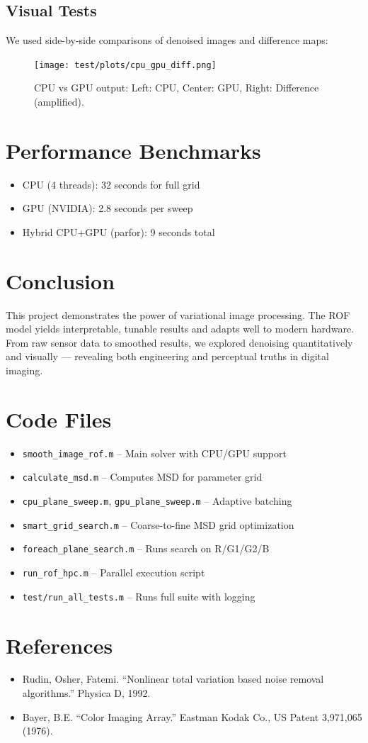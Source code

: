 \documentclass[11pt]{article}
\begin{document}
\subsection*{Visual Tests}
We used side-by-side comparisons of denoised images and difference maps:

\begin{figure}[h]
    \centering
    \texttt{[image: test/plots/cpu\_gpu\_diff.png]}
    \caption{CPU vs GPU output: Left: CPU, Center: GPU, Right: Difference (amplified).}
\end{figure}

\section*{Performance Benchmarks}
\begin{itemize}
  \item CPU (4 threads): 32 seconds for full grid
  \item GPU (NVIDIA): 2.8 seconds per sweep
  \item Hybrid CPU+GPU (parfor): 9 seconds total
\end{itemize}

\section*{Conclusion}
This project demonstrates the power of variational image processing. The ROF model yields interpretable, tunable results and adapts well to modern hardware. From raw sensor data to smoothed results, we explored denoising quantitatively and visually — revealing both engineering and perceptual truths in digital imaging.

\appendix
\section*{Code Files}
\begin{itemize}
  \item \texttt{smooth\_image\_rof.m} – Main solver with CPU/GPU support
  \item \texttt{calculate\_msd.m} – Computes MSD for parameter grid
  \item \texttt{cpu\_plane\_sweep.m}, \texttt{gpu\_plane\_sweep.m} – Adaptive batching
  \item \texttt{smart\_grid\_search.m} – Coarse-to-fine MSD grid optimization
  \item \texttt{foreach\_plane\_search.m} – Runs search on R/G1/G2/B
  \item \texttt{run\_rof\_hpc.m} – Parallel execution script
  \item \texttt{test/run\_all\_tests.m} – Runs full suite with logging
\end{itemize}

\section*{References}
\begin{itemize}
  \item Rudin, Osher, Fatemi. “Nonlinear total variation based noise removal algorithms.” Physica D, 1992.
  \item Bayer, B.E. “Color Imaging Array.” Eastman Kodak Co., US Patent 3,971,065 (1976).
\end{itemize}
\end{document}
